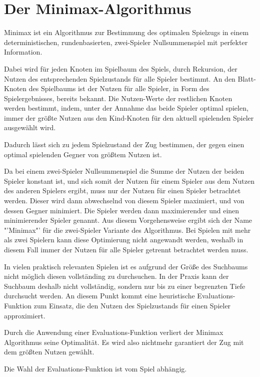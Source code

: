 \section{Der Minimax-Algorithmus}

Minimax ist ein Algorithmus zur Bestimmung des optimalen Spielzugs in einem deterministischen, rundenbasierten, zwei-Spieler Nullsummenspiel mit perfekter Information.

Dabei wird für jeden Knoten im Spielbaum des Spiels, durch Rekursion, der Nutzen des entsprechenden Spielzustands für alle Spieler bestimmt.
An den Blatt-Knoten des Spielbaums ist der Nutzen für alle Spieler, in Form des Spielergebnisses, bereits bekannt.
Die Nutzen-Werte der restlichen Knoten werden bestimmt, indem, unter der Annahme das beide Spieler optimal spielen, immer der größte Nutzen aus den Kind-Knoten für den aktuell spielenden Spieler ausgewählt wird.
\cite[S.~165]{ai2010russel}

Dadurch lässt sich zu jedem Spielzustand der Zug bestimmen, der gegen einen optimal spielenden Gegner von größtem Nutzen ist.

Da bei einem zwei-Spieler Nullsummenspiel die Summe der Nutzen der beiden Spieler konstant ist, und sich somit der Nutzen für einem Spieler aus dem Nutzen des anderen Spielers ergibt, muss nur der Nutzen für einen Spieler betrachtet werden. Dieser wird dann abwechselnd von diesem Spieler maximiert, und von dessen Gegner minimiert.
Die Spieler werden dann maximierender und einen minimierender Spieler genannt.
Aus diesem Vorgehensweise ergibt sich der Name "'Minimax"' für die zwei-Spieler Variante des Algorithmus.
Bei Spielen mit mehr als zwei Spielern kann diese Optimierung nicht angewandt werden, weshalb in diesem Fall immer der Nutzen für alle Spieler getrennt betrachtet werden muss.
\cite[S.~165]{ai2010russel}

In vielen praktisch relevanten Spielen ist es aufgrund der Größe des Suchbaums nicht möglich diesen vollständing zu durchsuchen.
In der Praxis kann der Suchbaum deshalb nicht vollständig, sondern nur bis zu einer begrenzten Tiefe durchsucht werden. An diesem Punkt kommt eine heuristische Evaluations-Funktion zum Einsatz,
die den Nutzen des Spielzustands für einen Spieler approximiert.
\cite[S.~171]{ai2010russel}

Durch die Anwendung einer Evaluations-Funktion verliert der Minimax Algorithmus seine Optimalität.
Es wird also nichtmehr garantiert der Zug mit dem größten Nutzen gewählt.

Die Wahl der Evaluations-Funktion ist vom Spiel abhängig.


